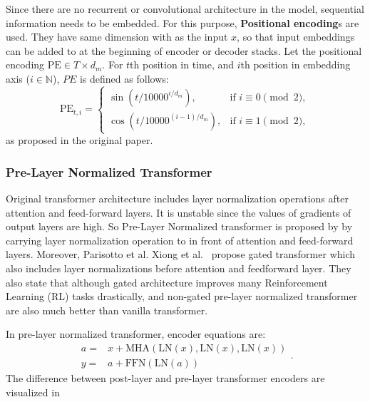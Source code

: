 Since there are no recurrent or convolutional architecture in the model, sequential information needs to be embedded. 
For this purpose, \textbf{Positional encoding}s are used. 
They have same dimension with as the input $x$, so that input embeddings can be added to at the beginning of encoder or decoder stacks. 
Let the positional encoding $\mathrm{PE} \in {T \times d_m}$.
For $t$th position in time, and $i$th position in embedding axis ($i \in \mathbb{N}$), $PE$ is defined as follows: 
\begin{equation}
\mathrm{PE}_{t,i} = 
\begin{cases}
\sin(t/10000^{i/d_m}),   & \text{if } i \equiv 0 \pmod 2 ,\\
\cos(t/10000^{(i-1)/d_m}),   & \text{if } i \equiv 1 \pmod 2 ,
\end{cases}
\end{equation}
as proposed in the original paper. 

\subsubsection{Pre-Layer Normalized Transformer}

Original transformer architecture includes layer normalization operations after attention and feed-forward layers. 
It is unstable since the values of gradients of output layers are high. 
So Pre-Layer Normalized transformer is proposed by \cite{xiong_layer_2020} by carrying layer normalization operation to in front of attention and feed-forward layers. 
Moreover, Parisotto et al. Xiong et al.~ \cite{parisotto_stabilizing_2019} propose gated transformer which also includes layer normalizations before attention and feedforward layer. 
They also state that although gated architecture improves many Reinforcement Learning (RL) tasks drastically, and non-gated pre-layer normalized transformer are also much better than vanilla transformer. 

In pre-layer normalized transformer, encoder equations are: 
\begin{equation}
\begin{split}
a = & x+ \mathrm{MHA}(\mathrm{LN}(x),\mathrm{LN}(x),\mathrm{LN}(x)) \\
y = & a + \mathrm{FFN}(\mathrm{LN}(a))
\end{split}.
\end{equation}
The difference between post-layer and pre-layer transformer encoders are visualized in 

